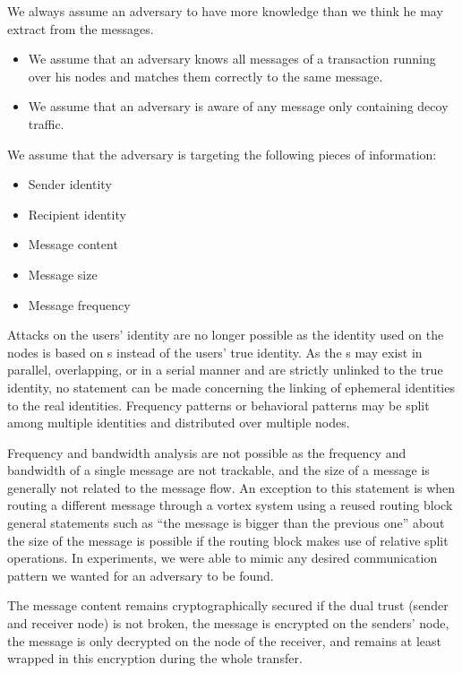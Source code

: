 We always assume an adversary to have more knowledge than we think he may extract from the messages.
\begin{itemize}
	\item We assume that an adversary knows all messages of a transaction running over his nodes and matches them correctly to the same message.
	\item We assume that an adversary is aware of any message only containing decoy traffic.
\end{itemize}

We assume that the adversary is targeting the following pieces of information:
\begin{itemize}
	\item Sender identity
	\item Recipient identity
	\item Message content
	\item Message size
	\item Message frequency
\end{itemize}

Attacks on the users' identity are no longer possible as the identity used on the nodes is based on s instead of the users' true identity. As the s may exist in parallel, overlapping, or in a serial manner and are strictly unlinked to the true identity, no statement can be made concerning the linking of ephemeral identities to the real identities. Frequency patterns or behavioral patterns may be split among multiple identities and distributed over multiple nodes. 

Frequency and bandwidth analysis are not possible as the frequency and bandwidth of a single message are not trackable, and the size of a message is generally not related to the message flow. An exception to this statement is when routing a different message through a vortex system using a reused routing block general statements such as ``the message is bigger than the previous one'' about the size of the message is possible if the routing block makes use of relative split operations. In experiments, we were able to mimic any desired communication pattern we wanted for an adversary to be found.

The message content remains cryptographically secured if the dual trust (sender and receiver node) is not broken, the message is encrypted on the senders' node, the message is only decrypted on the node of the receiver, and remains at least wrapped in this encryption during the whole transfer. 

